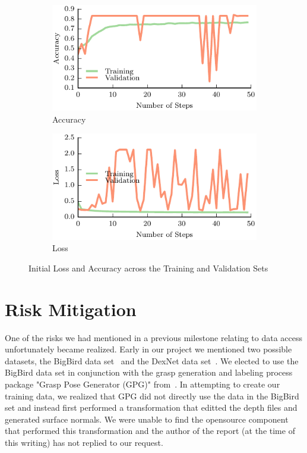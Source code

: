 \documentclass[letterpaper, 10 pt]{article}
\begin{document}
\begin{figure}[t!]
    \begin{subfigure}[t]{0.49\textwidth}
        \includegraphics[width=0.99\columnwidth]{figs/accuracy.pdf}
        \caption{Accuracy} \label{fig:accuracy}
        \end{subfigure}
    \begin{subfigure}[t]{0.49\textwidth}
        \includegraphics[width=0.99\columnwidth]{figs/loss.pdf}
        \caption{Loss} \label{fig:loss}
    \end{subfigure}
\caption{Initial Loss and Accuracy across the Training and Validation Sets} \label{fig:results}
\end{figure}


\section{Risk Mitigation}
\label{sec:risk}
One of the risks we had mentioned in a previous milestone relating to data access unfortunately became realized. 
Early in our project we mentioned two possible datasets, the BigBird data set~\cite{singh2014bigbird} and the DexNet data set~\cite{mahler2017dex}.
We elected to use the BigBird data set in conjunction with the grasp generation and labeling process package "Grasp Pose Generator (GPG)" from~\cite{pas2017grasp}.
In attempting to create our training data, we realized that GPG did not directly use the data in the BigBird set and instead first performed a transformation that editted the depth files and generated surface normals. 
We were unable to find the opensource component that performed this transformation and the author of the report (at the time of this writing) has not replied to our request. 
\end{document}
